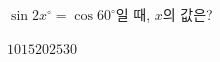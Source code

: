 $\sin 2x^\circ=\cos 60^\circ$일 때, $x$의 값은? 
\begin{choices32}{$10$}{$15$}{$20$}{$25$}{$30$}\end{choices32}
